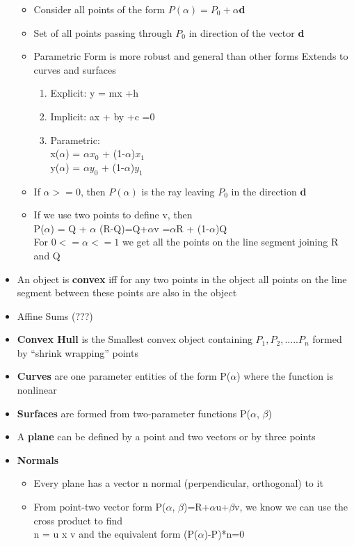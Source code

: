 \documentclass[11pt,a4paper]{article}
\begin{document}
\begin{itemize}
				\begin{itemize}
					\item Consider all points of the form $P(\alpha)=P_0 + \alpha$\textbf{d}
					\item Set of all points passing through $P_0$ in direction of the vector \textbf{d}
					\item Parametric Form is more robust and general than other forms Extends to curves and surfaces
						\begin{enumerate}
							\item Explicit: y = mx +h
							\item Implicit: ax + by +c =0
							\item Parametric:\\
							x($\alpha$) = $\alpha x_0$ + (1-$\alpha$)$x_1$ \\
							y($\alpha$) = $\alpha y_0$  + (1-$\alpha$)$y_1$
						\end{enumerate}
					\item If $\alpha >= 0$, then $P(\alpha)$ is the ray leaving $P_0$ in the direction \textbf{d}
					\item If we use two points to define v, then\\
						 P($\alpha$) = Q + $\alpha$ (R-Q)=Q+$\alpha$v =$\alpha$R + (1-$\alpha$)Q\\
						 For $0<=\alpha<=1$ we get all the points on the line segment joining R and Q
				\end{itemize}			
			\item An object is \textbf{convex} iff for any two points in the object all points on the line segment between these points are also in the object
			\item Affine Sums (???)
			\item \textbf{Convex Hull} is the Smallest convex object containing $P_1, P_2, ..... P_n$ formed by “shrink wrapping” points
			\item \textbf{Curves} are one parameter entities of the form P($\alpha$) where the function is nonlinear
			\item \textbf{Surfaces} are formed from two-parameter functions P($\alpha$, $\beta$)	
			\item A \textbf{plane} can be defined by a point and two vectors or by three points
			\item \textbf{Normals}
				\begin{itemize}
					\item Every plane has a vector n normal (perpendicular, orthogonal) to it	
					\item From point-two vector form P($\alpha$, $\beta$)=R+$\alpha$u+$\beta$v, we know we can use the cross product to find\\
					n = u x v and the equivalent form (P($\alpha$)-P)*n=0 	
				\end{itemize}
		\end{itemize}
\end{document}
